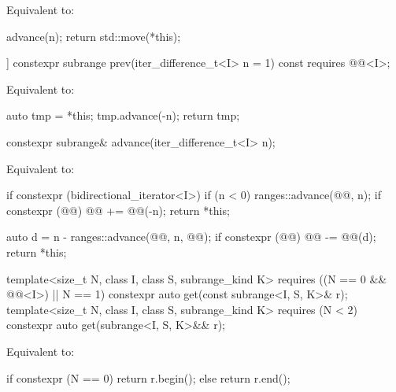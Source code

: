 \begin{itemdescr}
\pnum
\effects
Equivalent to:
\begin{codeblock}
advance(n);
return std::move(*this);
\end{codeblock}
\end{itemdescr}

%
\begin{itemdecl}
[[nodiscard]] constexpr subrange prev(iter_difference_t<I> n = 1) const
  requires @@<I>;
\end{itemdecl}

\begin{itemdescr}
\pnum
\effects
Equivalent to:
\begin{codeblock}
auto tmp = *this;
tmp.advance(-n);
return tmp;
\end{codeblock}
\end{itemdescr}

%
\begin{itemdecl}
constexpr subrange& advance(iter_difference_t<I> n);
\end{itemdecl}

\begin{itemdescr}
\pnum
\effects
Equivalent to:
\begin{codeblock}
if constexpr (bidirectional_iterator<I>) {
  if (n < 0) {
    ranges::advance(@@, n);
    if constexpr (@@)
      @@ += @@(-n);
    return *this;
  }
}

auto d = n - ranges::advance(@@, n, @@);
if constexpr (@@)
  @@ -= @@(d);
return *this;
\end{codeblock}
\end{itemdescr}

%
\begin{itemdecl}
template<size_t N, class I, class S, subrange_kind K>
  requires ((N == 0 && @@<I>) || N == 1)
  constexpr auto get(const subrange<I, S, K>& r);
template<size_t N, class I, class S, subrange_kind K>
  requires (N < 2)
  constexpr auto get(subrange<I, S, K>&& r);
\end{itemdecl}

\begin{itemdescr}
\pnum
\effects
Equivalent to:
\begin{codeblock}
if constexpr (N == 0)
  return r.begin();
else
  return r.end();
\end{codeblock}
\end{itemdescr}

